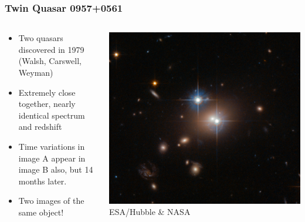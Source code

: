 \documentclass{beamer}
\begin{document}
\frame
{
    \frametitle{Twin Quasar 0957+0561}

    \begin{columns}
        \begin{column}{0.5\textwidth}    
            \begin{itemize}

                \item Two quasars discovered in 1979 (Walsh, Carswell, Weyman)

                \item Extremely close together, nearly identical spectrum and redshift

                \item Time variations in image A appear in image B also, but 14 months later.

                \item Two images of the same object!
                    
            \end{itemize}
        \end{column}
        \begin{column}{0.5\textwidth}
            \begin{center}
                \includegraphics[width=\textwidth]{QSO_B0957+0561-crop.jpg}
                \newline
                {\tiny ESA/Hubble \& NASA}
            \end{center}
        \end{column}
    \end{columns}
}
\end{document}
